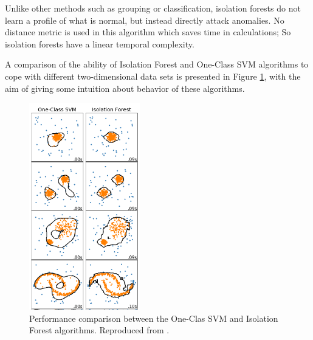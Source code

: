 \vspace{5mm} %

Unlike other methods such as grouping or classification, isolation forests do not learn a profile of what is normal, but instead directly attack anomalies. No distance metric is used in this algorithm which saves time in calculations; So isolation forests have a linear temporal complexity.

\vspace{5mm} %

A comparison of the ability of Isolation Forest and One-Class SVM algorithms to cope with different two-dimensional data sets is presented in Figure \ref{fig:comparacion}, with the aim of giving some intuition about behavior of these algorithms.

\begin{figure}[h!]
  \begin{center}	\includegraphics[width=0.43\textwidth, frame]{imagenes/Cap4/comp_if_ocsvm}
  \caption{Performance comparison between the One-Clas SVM and Isolation Forest algorithms. Reproduced from \protect\cite{Reference73}.} 
  \label{fig:comparacion}
  \end{center}
\end{figure}

